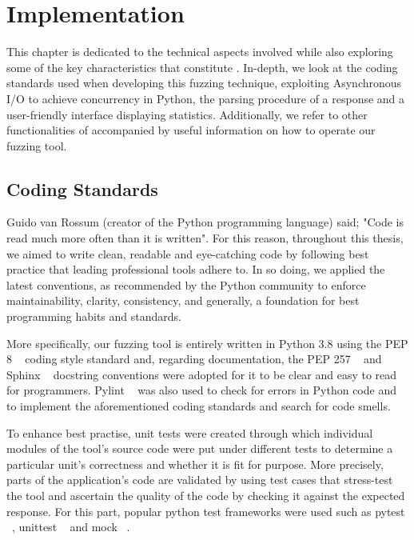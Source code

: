 \chapter{Implementation}
\label{sec:implementation}
\minitoc
\vspace*{1cm}

This chapter is dedicated to the technical aspects involved while also exploring some of the key characteristics that constitute \pname{}. In-depth, we look at the coding standards used when developing this fuzzing technique, exploiting Asynchronous I/O to achieve concurrency in Python, the parsing procedure of a response and a user-friendly interface displaying statistics. Additionally, we refer to other functionalities of \pname{} accompanied by useful information on how to operate our fuzzing tool.

\section{Coding Standards}
Guido van Rossum (creator of the Python programming language) said; "Code is read much more often than it is written". For this reason, throughout this thesis, we aimed to write clean, readable and eye-catching code by following best practice that leading professional tools adhere to. In so doing, we applied the latest conventions, as recommended by the Python community to enforce maintainability, clarity, consistency, and generally, a foundation for best programming habits and standards. 

More specifically, our fuzzing tool is entirely written in Python 3.8 using the PEP 8 ~\cite{python_pep8} coding style standard and, regarding documentation, the PEP 257 ~\cite{python_pep257} and Sphinx ~\cite{sphinx} docstring conventions were adopted for it to be clear and easy to read for programmers. Pylint ~\cite{pylint_module} was also used to check for errors in Python code and to implement the aforementioned coding standards and search for code smells.

To enhance best practise, unit tests were created through which individual modules of the tool's source code were put under different tests to determine a particular unit's correctness and whether it is fit for purpose. More precisely, parts of the application's code are validated by using test cases that stress-test the tool and ascertain the quality of the code by checking it against the expected response. For this part, popular python test frameworks were used such as pytest ~\cite{pytest_module}, unittest ~\cite{unittest_module} and mock ~\cite{mock}.

